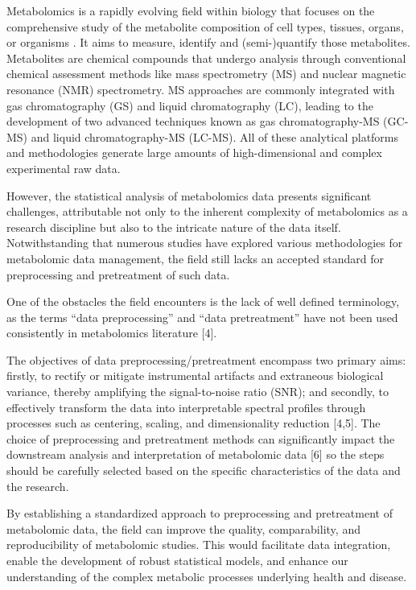 \documentclass[ENG, BIB]{TFUOC}%
\begin{document}
Metabolomics is a rapidly evolving field within biology that focuses on the comprehensive study of the metabolite composition of cell types, tissues, organs, or organisms \cite{pattiMetabolomicsApogeeOmics2012,zhangSerumMetabolomicsNovel2012,chenGuideMetabolomicsAnalysis2022a}. It aims to measure, identify and (semi-)quantify those metabolites. Metabolites are chemical compounds that undergo analysis through conventional chemical assessment methods like mass spectrometry (MS) and nuclear magnetic resonance (NMR) spectrometry. MS approaches are commonly integrated with gas chromatography (GS) and liquid chromatography (LC), leading to the development of two advanced techniques known as gas chromatography-MS (GC-MS) and liquid chromatography-MS (LC-MS). All of these analytical platforms and methodologies generate large amounts of high-dimensional and complex experimental raw data.

However, the statistical analysis of metabolomics data presents significant challenges, attributable not only to the inherent complexity of metabolomics as a research discipline but also to the intricate nature of the data itself. Notwithstanding that numerous studies have explored various methodologies for metabolomic data management, the field still lacks an accepted standard for preprocessing and pretreatment of such data.

One of the obstacles the field encounters is the lack of well defined terminology, as the terms “data preprocessing” and “data pretreatment” have not been used consistently in metabolomics literature [4].

The objectives of data preprocessing/pretreatment encompass two primary aims: firstly, to rectify or mitigate instrumental artifacts and extraneous biological variance, thereby amplifying the signal-to-noise ratio (SNR); and secondly, to effectively transform the data into interpretable spectral profiles through processes such as centering, scaling, and dimensionality reduction [4,5]. The choice of preprocessing and pretreatment methods can significantly impact the downstream analysis and interpretation of metabolomic data [6] so the steps should be carefully selected based on the specific characteristics of the data and the research.

By establishing a standardized approach to preprocessing and pretreatment of metabolomic data, the field can improve the quality, comparability, and reproducibility of metabolomic studies. This would facilitate data integration, enable the development of robust statistical models, and enhance our understanding of the complex metabolic processes underlying health and disease.
\end{document}
